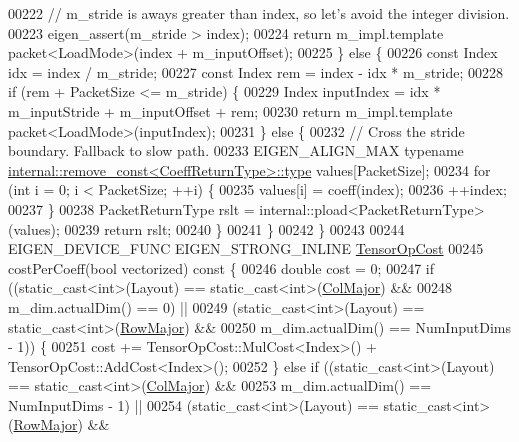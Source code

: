 \begin{DoxyCode}
00222       \textcolor{comment}{// m\_stride is aways greater than index, so let's avoid the integer division.}
00223       eigen\_assert(m\_stride > index);
00224       \textcolor{keywordflow}{return} m\_impl.template packet<LoadMode>(index + m\_inputOffset);
00225     \} \textcolor{keywordflow}{else} \{
00226       \textcolor{keyword}{const} Index idx = index / m\_stride;
00227       \textcolor{keyword}{const} Index rem = index - idx * m\_stride;
00228       \textcolor{keywordflow}{if} (rem + PacketSize <= m\_stride) \{
00229         Index inputIndex = idx * m\_inputStride + m\_inputOffset + rem;
00230         \textcolor{keywordflow}{return} m\_impl.template packet<LoadMode>(inputIndex);
00231       \} \textcolor{keywordflow}{else} \{
00232         \textcolor{comment}{// Cross the stride boundary. Fallback to slow path.}
00233         EIGEN\_ALIGN\_MAX \textcolor{keyword}{typename} \hyperlink{group___sparse_core___module}{internal::remove\_const<CoeffReturnType>::type}
       values[PacketSize];
00234         \textcolor{keywordflow}{for} (\textcolor{keywordtype}{int} i = 0; i < PacketSize; ++i) \{
00235           values[i] = coeff(index);
00236           ++index;
00237         \}
00238         PacketReturnType rslt = internal::pload<PacketReturnType>(values);
00239         \textcolor{keywordflow}{return} rslt;
00240       \}
00241     \}
00242   \}
00243 
00244   EIGEN\_DEVICE\_FUNC EIGEN\_STRONG\_INLINE \hyperlink{class_eigen_1_1_tensor_op_cost}{TensorOpCost}
00245   costPerCoeff(\textcolor{keywordtype}{bool} vectorized)\textcolor{keyword}{ const }\{
00246     \textcolor{keywordtype}{double} cost = 0;
00247     \textcolor{keywordflow}{if} ((static\_cast<int>(Layout) == static\_cast<int>(\hyperlink{group__enums_ggaacded1a18ae58b0f554751f6cdf9eb13a0cbd4bdd0abcfc0224c5fcb5e4f6669a}{ColMajor}) &&
00248          m\_dim.actualDim() == 0) ||
00249         (static\_cast<int>(Layout) == \textcolor{keyword}{static\_cast<}\textcolor{keywordtype}{int}\textcolor{keyword}{>}(\hyperlink{group__enums_ggaacded1a18ae58b0f554751f6cdf9eb13acfcde9cd8677c5f7caf6bd603666aae3}{RowMajor}) &&
00250          m\_dim.actualDim() == NumInputDims - 1)) \{
00251       cost += TensorOpCost::MulCost<Index>() + TensorOpCost::AddCost<Index>();
00252     \} \textcolor{keywordflow}{else} \textcolor{keywordflow}{if} ((static\_cast<int>(Layout) == static\_cast<int>(\hyperlink{group__enums_ggaacded1a18ae58b0f554751f6cdf9eb13a0cbd4bdd0abcfc0224c5fcb5e4f6669a}{ColMajor}) &&
00253                 m\_dim.actualDim() == NumInputDims - 1) ||
00254                (static\_cast<int>(Layout) == \textcolor{keyword}{static\_cast<}\textcolor{keywordtype}{int}\textcolor{keyword}{>}(\hyperlink{group__enums_ggaacded1a18ae58b0f554751f6cdf9eb13acfcde9cd8677c5f7caf6bd603666aae3}{RowMajor}) &&

\end{DoxyCode}

